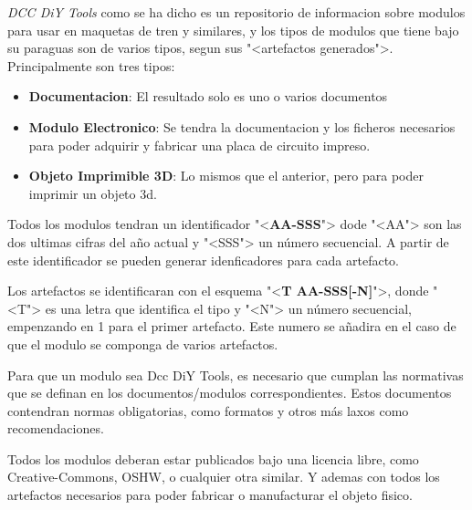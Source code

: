 \textit{DCC DiY Tools} como se ha dicho es un repositorio de informacion sobre
modulos para usar en maquetas de tren y similares, y los tipos de modulos que tiene
bajo su paraguas son de varios tipos, segun sus "<artefactos generados">. Principalmente
son tres tipos:
\begin{itemize}
    \item \textbf{Documentacion}: El resultado solo es uno o varios documentos
    \item \textbf{Modulo Electronico}: Se tendra la documentacion y los ficheros necesarios 
    para poder adquirir y fabricar una placa de circuito impreso. 
    \item \textbf{Objeto Imprimible 3D}: Lo mismos que el anterior, pero para poder 
    imprimir un objeto 3d.
\end{itemize}

Todos los modulos tendran un identificador "<\textbf{AA-SSS}"> dode "<AA"> son las dos
ultimas cifras del año actual y "<SSS"> un número secuencial. A partir de este identificador
se pueden generar idenficadores para cada artefacto.

Los artefactos se identificaran con el esquema "<\textbf{T AA-SSS[-N]}">, donde "<T"> es una
letra que identifica el tipo y "<N"> un número secuencial, empenzando en 1 para el primer
artefacto. Este numero se añadira en el caso de que el modulo se componga de varios
artefactos.

Para que un modulo sea Dcc DiY Tools, es necesario que cumplan las normativas que se
definan en los documentos/modulos correspondientes. Estos documentos contendran 
normas obligatorias, como formatos y otros más laxos como recomendaciones.

Todos los modulos deberan estar publicados bajo una licencia libre, como Creative-Commons,
OSHW, o cualquier otra similar. Y ademas con todos los artefactos necesarios para poder
fabricar o manufacturar el objeto fisico. 